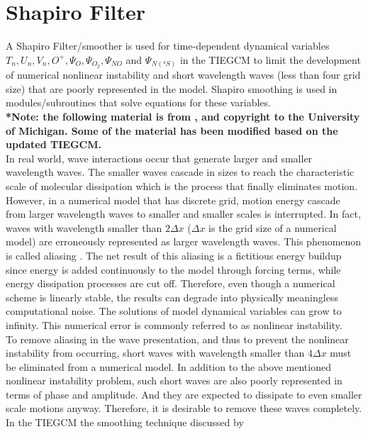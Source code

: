 %
\section{Shapiro Filter }\label{cap:shapiro}
%
A Shapiro Filter/smoother is used for  
time-dependent dynamical variables $T_n, U_n, V_n, O^+, \Psi_O, \Psi_{O_2},
\Psi_{NO}$  and  $\Psi_{N(^4S)}$
in the TIEGCM to limit the development of numerical 
nonlinear instability and short wavelength waves 
(less than four grid size) that are poorly represented 
in the model. Shapiro smoothing is used in 
modules/subroutines that solve equations for 
these variables. \\
%
\textbf{*Note: the following material is from \cite{wang1998}, 
and copyright to the University of Michigan. Some of 
the material has been modified based on the updated TIEGCM. } \\
%
In real world, wave interactions occur that generate 
larger and smaller wavelength waves. The smaller waves 
cascade in sizes to reach the characteristic scale of 
molecular dissipation which is the process that finally 
eliminates motion. However, in a numerical model that has 
discrete grid, motion energy cascade from larger wavelength 
waves to smaller and smaller scales is interrupted. In fact, 
waves with wavelength smaller than $2 \Delta x$ ($\Delta x$ is the grid size 
of a numerical model) are erroneously represented as larger 
wavelength waves. This phenomenon is called aliasing 
\cite{pielke1984}. The net result of this aliasing is a 
fictitious energy buildup since energy is added 
continuously to the model through forcing terms, 
while energy dissipation processes are cut off. 
Therefore, even though a numerical scheme is 
linearly stable, the results can degrade into physically 
meaningless computational noise. The solutions of model 
dynamical variables can grow to infinity. This numerical 
error is commonly referred to as nonlinear instability. \\
%
To remove aliasing in the wave presentation, and thus to 
prevent the nonlinear instability from occurring, short 
waves with wavelength smaller than $4 \Delta x$ must be eliminated 
from a numerical model. In addition to the above mentioned 
nonlinear instability problem, such short waves are also 
poorly represented in terms of phase and amplitude. And they 
are expected to dissipate to even smaller scale motions anyway. 
Therefore, it is desirable to remove these waves completely.\\
%
In the TIEGCM the smoothing technique discussed by \cite{shapiro1970} 
